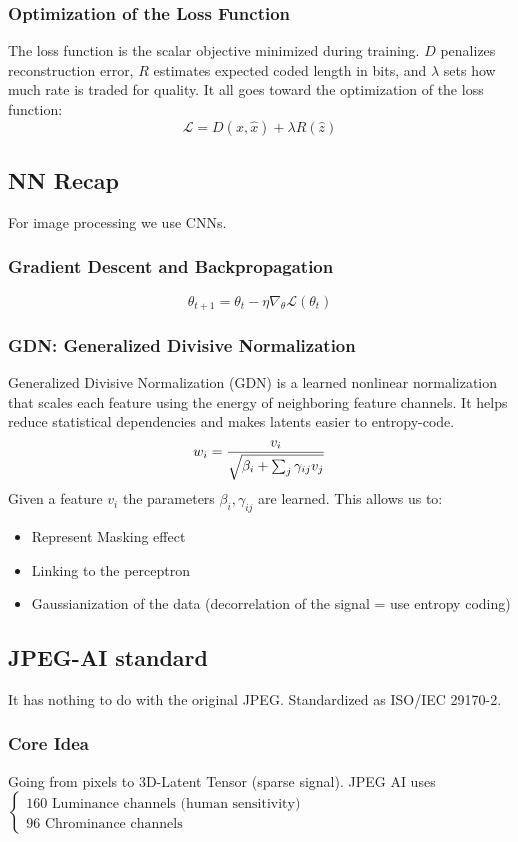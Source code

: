 \subsubsection{Optimization of the Loss Function}
The loss function is the scalar objective minimized during training. $D$ penalizes reconstruction error, $R$ estimates expected coded length in bits, and $\lambda$ sets how much rate is traded for quality.
It all goes toward the optimization of the loss function:
$$\mathcal{L} = D(x,\hat{x}) + \lambda R(\hat{z})$$
\subsection{NN Recap}
For image processing we use CNNs.
\subsubsection{Gradient Descent and Backpropagation}
$$\theta_{t+1} = \theta_t - \eta\nabla_\theta \mathcal{L}\left(\theta_t\right)$$
\subsubsection{GDN: Generalized Divisive Normalization}
Generalized Divisive Normalization (GDN) is a learned nonlinear normalization that scales each feature using the energy of neighboring feature channels. It helps reduce statistical dependencies and makes latents easier to entropy-code.
$$w_i = \frac{v_i}{\sqrt{\beta_i + \sum_{j}^{}\gamma_{ij}v_j}}$$
Given a feature $v_i$ the parameters $\beta_i, \gamma_{ij}$ are learned. This allows us to:
\begin{itemize}
    \item Represent Masking effect
    \item Linking to the perceptron
    \item Gaussianization of the data (decorrelation of the signal = use entropy coding)
\end{itemize}
\subsection{JPEG-AI standard}
It has nothing to do with the original JPEG. Standardized as ISO/IEC 29170-2.
\subsubsection{Core Idea}
Going from pixels to 3D-Latent Tensor (sparse signal). JPEG AI uses $\begin{cases}
    160 \text{ Luminance channels (human sensitivity)}\\
    96\text{ Chrominance channels}
\end{cases}$
